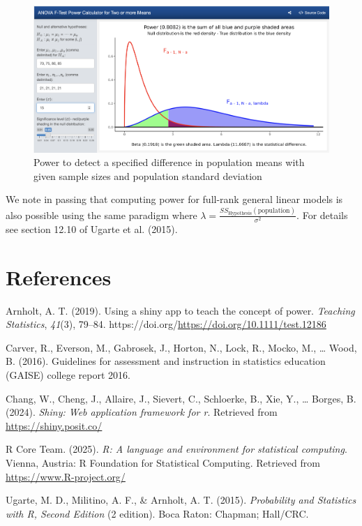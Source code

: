 \documentclass[
]{article}
\newlength{\cslhangindent}
\newlength{\cslentryspacingunit} %
\newenvironment{CSLReferences}[2] %
 {%
  \setlength{\parindent}{0pt}
  \ifodd #1
  \let\oldpar\par
  \def\par{\hangindent=\cslhangindent\oldpar}
  \fi
  \setlength{\parskip}{#2\cslentryspacingunit}
 }%
 {}
\begin{document}
\begin{figure}

{\centering \includegraphics[width=7.35in]{./pics/fig-power4b} 

}

\caption{Power to detect a specified difference in population means with given sample sizes and population standard deviation}\label{fig:power4}
\end{figure}

We note in passing that computing power for full-rank general linear models is also possible using the same paradigm where \(\lambda = \frac{SS_\text{Hypothesis}(\text{population})}{\sigma^2}\). For details see section 12.10 of Ugarte et al. (2015).

\hypertarget{references}{%
\section*{References}\label{references}}

\hypertarget{refs}{}
\begin{CSLReferences}{1}{0}
\leavevmode{}%
Arnholt, A. T. (2019). Using a shiny app to teach the concept of power. \emph{Teaching Statistics}, \emph{41}(3), 79--84. https://doi.org/\url{https://doi.org/10.1111/test.12186}

\leavevmode{}%
Carver, R., Everson, M., Gabrosek, J., Horton, N., Lock, R., Mocko, M., \ldots{} Wood, B. (2016). Guidelines for assessment and instruction in statistics education (GAISE) college report 2016.

\leavevmode{}%
Chang, W., Cheng, J., Allaire, J., Sievert, C., Schloerke, B., Xie, Y., \ldots{} Borges, B. (2024). \emph{Shiny: Web application framework for r}. Retrieved from \url{https://shiny.posit.co/}

\leavevmode{}%
R Core Team. (2025). \emph{R: A language and environment for statistical computing}. Vienna, Austria: R Foundation for Statistical Computing. Retrieved from \url{https://www.R-project.org/}

\leavevmode{}%
Ugarte, M. D., Militino, A. F., \& Arnholt, A. T. (2015). \emph{Probability and {Statistics} with {R}, {Second} {Edition}} (2 edition). Boca Raton: Chapman; Hall/CRC.

\end{CSLReferences}
\end{document}
